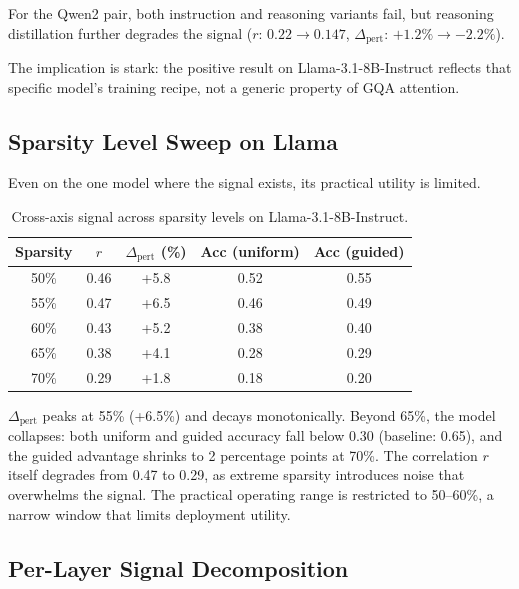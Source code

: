 \documentclass[11pt]{article}
\begin{document}
For the Qwen2 pair, both instruction and reasoning variants fail, but reasoning distillation further degrades the signal ($r$: $0.22 \rightarrow 0.147$, $\Delta_\text{pert}$: $+1.2\% \rightarrow -2.2\%$).

The implication is stark: the positive result on Llama-3.1-8B-Instruct reflects that specific model's training recipe, not a generic property of GQA attention.

\subsection{Sparsity Level Sweep on Llama}

Even on the one model where the signal exists, its practical utility is limited.

\begin{table}[h]
\centering
\caption{Cross-axis signal across sparsity levels on Llama-3.1-8B-Instruct.}
\label{tab:sparsity}
\small
\begin{tabular}{@{}ccccc@{}}
\toprule
Sparsity & $r$ & $\Delta_\text{pert}$ (\%) & Acc (uniform) & Acc (guided) \\
\midrule
50\% & 0.46 & +5.8 & 0.52 & 0.55 \\
55\% & 0.47 & +6.5 & 0.46 & 0.49 \\
60\% & 0.43 & +5.2 & 0.38 & 0.40 \\
65\% & 0.38 & +4.1 & 0.28 & 0.29 \\
70\% & 0.29 & +1.8 & 0.18 & 0.20 \\
\bottomrule
\end{tabular}
\end{table}

$\Delta_\text{pert}$ peaks at 55\% (+6.5\%) and decays monotonically. Beyond 65\%, the model collapses: both uniform and guided accuracy fall below 0.30 (baseline: 0.65), and the guided advantage shrinks to 2 percentage points at 70\%. The correlation $r$ itself degrades from 0.47 to 0.29, as extreme sparsity introduces noise that overwhelms the signal. The practical operating range is restricted to 50--60\%, a narrow window that limits deployment utility.

\subsection{Per-Layer Signal Decomposition}
\end{document}
